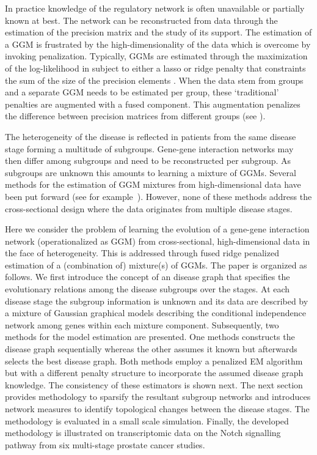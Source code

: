 \documentclass[10pt]{article}
\begin{document}
In practice knowledge of the regulatory network is often unavailable or partially known at best. The network can be reconstructed from data through the estimation of the precision matrix and the study of its support. The estimation of a GGM is frustrated by the high-dimensionality of the data which is overcome by invoking penalization. Typically, GGMs are estimated through the maximization of the log-likelihood in subject to either a lasso or ridge penalty that constraints the sum of the size of the precision elements \citep{friedman2008sparse,van2016ridge}. When the data stem from groups and a separate GGM needs to be estimated per group, these `traditional' penalties are augmented with a fused component. This augmentation penalizes the difference between precision matrices from different groups (see \citet{Bilg2015,danaher2014joint,guo2011joint,zhu2014structural}). 

The heterogeneity of the disease is reflected in patients from the same disease stage forming a multitude of subgroups. Gene-gene interaction networks may then differ among subgroups and need to be reconstructed per subgroup. As subgroups are unknown this amounts to learning a mixture of GGMs. 
Several methods for the estimation of GGM mixtures from high-dimensional data have been put forward 
(see for example~\citet{raftery2006variable,maugis2009,maugis2011non,ruan2011,lotsi2013,hill2013,azizyan2015}). However, none of these methods address the cross-sectional design where the data originates from multiple disease stages.


Here we consider the problem of learning the evolution of a gene-gene interaction network (operationalized as GGM) from cross-sectional, high-dimensional data in the face of heterogeneity. This is addressed through fused ridge penalized estimation of a (combination of) mixture(s) of GGMs. The paper is organized as follows. We first introduce the concept of an disease graph that specifies the evolutionary relations among the disease subgroups over the stages. At each disease stage the subgroup information is unknown and its data are described by a mixture of Gaussian graphical models describing the conditional independence network among genes within each mixture component. Subsequently, two methods for the model estimation are presented. One methods constructs the disease graph sequentially whereas the other assumes it known but afterwards selects the best disease graph. Both methods employ a penalized EM algorithm but with a different penalty structure to incorporate the assumed disease graph knowledge. The consistency of these estimators is shown next. The next section provides methodology to sparsify the resultant subgroup networks and introduces network measures to identify topological changes between the disease stages. The methodology is evaluated in a small scale simulation. Finally, the developed methodology is illustrated on transcriptomic data on the Notch signalling pathway from six multi-stage prostate cancer studies.
\end{document}
